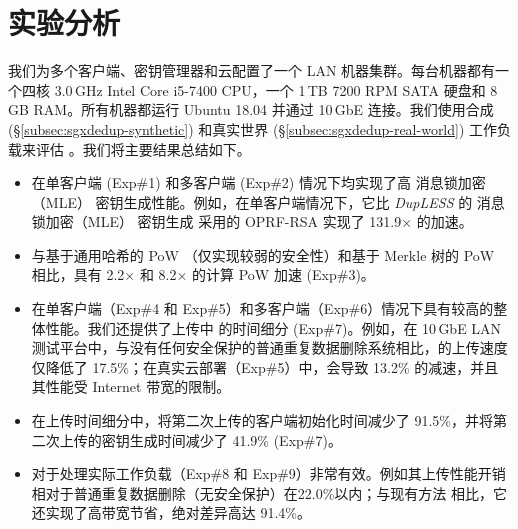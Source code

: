 \section{实验分析}
\label{sec:sgxdedup-evaluation}

我们为多个客户端、密钥管理器和云配置了一个 LAN 机器集群。每台机器都有一个四核 3.0\,GHz Intel Core i5-7400 CPU，一个 1\,TB 7200 RPM SATA 硬盘和 8\,GB RAM。所有机器都运行 Ubuntu 18.04 并通过 10\,GbE 连接。我们使用合成 (\S\ref{subsec:sgxdedup-synthetic}) 和真实世界 (\S\ref{subsec:sgxdedup-real-world}) 工作负载来评估 \sysnameS。我们将主要结果总结如下。

\begin{itemize}[leftmargin=*]
\item \sysnameS 在单客户端 (Exp\#1) 和多客户端 (Exp\#2) 情况下均实现了高 消息锁加密（MLE） 密钥生成性能。例如，在单客户端情况下，它比 {\em DupLESS} 的 消息锁加密（MLE） 密钥生成 \cite{bellare13b} 采用的 OPRF-RSA 实现了 131.9$\times$ 的加速。
\item \sysnameS 与基于通用哈希的 PoW \cite{xu2013weak}（仅实现较弱的安全性）和基于 Merkle 树的 PoW \cite{halevi11} 相比，具有 2.2$\times$ 和 8.2$\times$ 的计算 PoW 加速 (Exp\#3)。
\item \sysnameS 在单客户端（Exp\#4 和 Exp\#5）和多客户端（Exp\#6）情况下具有较高的整体性能。我们还提供了上传中 \sysnameS 的时间细分 (Exp\#7)。例如，在 10\,GbE LAN 测试平台中，与没有任何安全保护的普通重复数据删除系统相比，\sysnameS 的上传速度仅降低了 17.5\%；在真实云部署（Exp\#5）中，\sysnameS 会导致 13.2\% 的减速，并且其性能受 Internet 带宽的限制。
\item 在上传时间细分中，\sysnameS 将第二次上传的客户端初始化时间减少了 91.5\%，并将第二次上传的密钥生成时间减少了 41.9\% (Exp\#7)。
\item \sysnameS 对于处理实际工作负载（Exp\#8 和 Exp\#9）非常有效。例如其上传性能开销相对于普通重复数据删除（无安全保护）在22.0\%以内；与现有方法 \cite{li15,harnik10} 相比，它还实现了高带宽节省，绝对差异高达 91.4\%。
\end{itemize}


